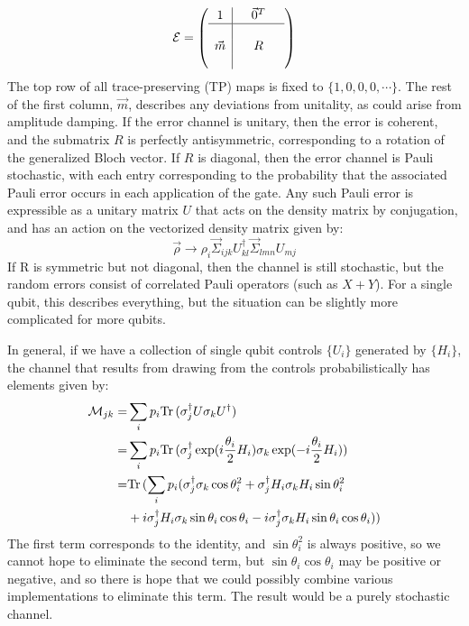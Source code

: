 \documentclass[aps,nofootinbib,pra,notitlepage,twocolumn]{revtex4-1}
\newcommand{\tr}{{\rm Tr\thinspace}}
\newcommand{\error}{\ensuremath{{\mathcal{E}}}}
\begin{document}
\begin{equation}\label{eq:process_matrix}
\error =
	\left(\begin{array}{c|cccc}
		1 &  & \vec{0}^T & \\ 
		\hline & &  &  \\
		\vec{m} &  & R &  \\
		 &  &  & 
	\end{array} 	
	\right)
\end{equation}
The top row of all trace-preserving (TP) maps is fixed to $\{1,0,0,0,\cdots\}$.  The rest of the first column, $\vec{m}$, describes any deviations from unitality, as could arise from amplitude damping. If the error channel is unitary, then the error is coherent, and the submatrix $R$ is perfectly antisymmetric, corresponding to a rotation of the generalized Bloch vector. If  $R$ is diagonal, then the error channel is Pauli stochastic, with each entry  corresponding to the probability that the associated Pauli error occurs in each application of the gate. Any such Pauli error is expressible as a unitary matrix $U$ that acts on the density matrix by conjugation, and has an action on the vectorized density matrix given by: 
\begin{equation}
\vec{\rho}\rightarrow \rho_i\vec{\Sigma}_{ijk}U^{\dagger}_{kl}\vec{\Sigma}_{lmn}U_{mj}\end{equation}
 If R is symmetric but not diagonal, then the channel is still stochastic, but the random errors consist of correlated Pauli operators (such as $X+Y$). For a single qubit, this describes everything, but the situation can be slightly more complicated for more qubits. 

In general, if we have a collection of single qubit controls $\{U_i\}$ generated by $\{H_i\}$, the channel that results from drawing from the controls probabilistically has elements given by:
\begin{align}
	\mathcal{M}_{jk} 
		=& \sum_i p_i \tr{(\sigma_j^{\dagger}U\sigma_kU^{\dagger})} \\
		=& \sum_i p_i \tr{(\sigma_j^{\dagger} \exp(i \frac{\theta_i}{2} H_i)\sigma_k		\exp(-i \frac{\theta_i}{2} H_i)}) \\
		=& \tr (\sum_i p_i (\sigma_j^{\dagger}\sigma_k\cos\theta_i^2 + \sigma_j^{\dagger}H_i\sigma_k H_i\sin\theta_i^2 \\ 
		&+ i\sigma_j^{\dagger}H_i\sigma_k\sin\theta_i\cos\theta_i - i\sigma_j^{\dagger}\sigma_kH_i\sin\theta_i\cos\theta_i))
\end{align}
The first term corresponds to the identity, and $\sin\theta_i^2$ is always positive, so we cannot hope to eliminate the second term, but $\sin\theta_i\cos\theta_i$ may be positive or negative, and so there is hope that we could possibly combine various implementations to eliminate this term. The result would be a purely stochastic channel. 
\end{document}
